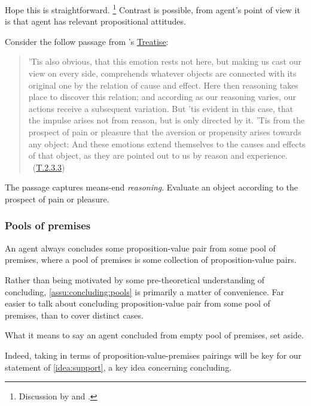 \begin{note}
  Hope this is straightforward.%
  \footnote{
    Discussion by \citeauthor{Collins:1997wn} and \citeauthor{Dancy:2000aa}.
  }
  Contrast is possible, from agent's point of view it is that agent has relevant propositional attitudes.

  Consider the follow passage from \citeauthor{Hume:2011aa}'s \hyperlink{cite.Hume:2011aa}{Treatise}:

  \begin{quote}
    ’Tis also obvious, that this emotion rests not here, but making us cast our view on every side, comprehends whatever objects are connected with its original one by the relation of cause and effect.
    Here then reasoning takes place to discover this relation; and according as our reasoning varies, our actions receive a subsequent variation.
    But ’tis evident in this case, that the impulse arises not from reason, but is only directed by it.
    ’Tis from the prospect of pain or pleasure that the aversion or propensity arises towards any object: And these emotions extend themselves to the causes and effects of that object, as they are pointed out to us by reason and experience.%
    \mbox{ }\hfill\mbox{(\hyperlink{cite.Hume:2011aa}{T.2.3.3})}
  \end{quote}

  The passage captures means-end \emph{reasoning}.
  Evaluate an object according to the prospect of pain or pleasure.
\end{note}

\subsubsection{Pools of premises}

\begin{note}
  \begin{assumption}
    \label{assu:concluding:pools}
    An agent always concludes some proposition-value pair from some pool of premises, where a pool of premises is some collection of proposition-value pairs.
  \end{assumption}

  Rather than being motivated by some pre-theoretical understanding of concluding, \autoref{assu:concluding:pools} is primarily a matter of convenience.
  Far easier to talk about concluding proposition-value pair from some pool of premises, than to cover distinct cases.

  What it means to say an agent concluded from empty pool of premises, set aside.

  Indeed, taking in terms of proposition-value-premises pairings will be key for our statement of \autoref{idea:support}, a key idea concerning concluding.
\end{note}

